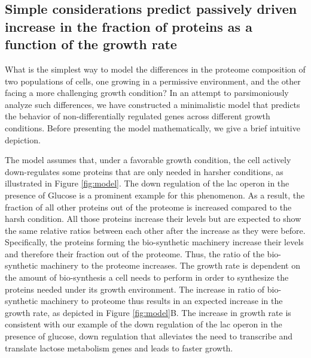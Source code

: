\subsection{Simple considerations predict passively driven increase in the fraction of proteins as a function of the growth rate}
What is the simplest way to model the differences in the proteome composition of two populations of cells, one growing in a permissive environment, and the other facing a more challenging growth condition?
In an attempt to parsimoniously analyze such differences, we have constructed a minimalistic model that predicts the behavior of non-differentially regulated genes across different growth conditions.
Before presenting the model mathematically, we give a brief intuitive depiction.

The model assumes that, under a favorable growth condition, the cell actively down-regulates some proteins that are only needed in harsher conditions, as illustrated in Figure \ref{fig:model}.
The down regulation of the lac operon in the presence of Glucose is a prominent example for this phenomenon. 
As a result, the fraction of all other proteins out of the proteome is increased compared to the harsh condition.
All those proteins increase their levels but are expected to show the same relative ratios between each other after the increase as they were before. 
Specifically, the proteins forming the bio-synthetic machinery increase their levels and therefore their fraction out of the proteome.
Thus, the ratio of the bio-synthetic machinery to the proteome increases.
The growth rate is dependent on the amount of bio-synthesis a cell needs to perform in order to synthesize the proteins needed under its growth environment.
The increase in ratio of bio-synthetic machinery to proteome thus results in an expected increase in the growth rate, as  depicted in Figure \ref{fig:model}B.
The increase in growth rate is consistent with our example of the down regulation of the lac operon in the presence of glucose, down regulation that alleviates the need to transcribe and translate lactose metabolism genes and leads to faster growth.